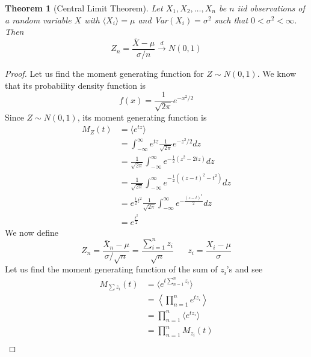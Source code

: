 \documentclass{article}
\newcommand{\twen}{\hspace{20pt}}
\newtheorem{theorem}[definition]{Theorem}
\begin{document}
\begin{theorem}[Central Limit Theorem]
    Let $X_1,X_2,\ldots, X_n$ be $n$ iid observations of a random variable $X$ with $\langle X_i\rangle =\mu$ and Var$(X_i) =\sigma^2$ such that $0<\sigma^2<\infty$. Then 
    \begin{equation*}
        Z_n = \frac{\bar X-\mu}{\sigma/n} \overset{d}{\longrightarrow} N(0,1)
    \end{equation*}
\end{theorem}
\begin{proof}
    Let us find the moment generating function for $Z\sim N(0,1)$. We know that its probability density function is 
    \begin{equation*}
        f(x) = \frac{1}{\sqrt{2\pi}}e^{-x^2/2}
    \end{equation*}
    Since $Z\sim N(0,1)$, its moment generating function is 
    \begin{equation*}
        \begin{split}
            M_Z(t) &= \langle e^{tz}\rangle \\
            &= \int^\infty_{-\infty}e^{tz}\frac{1}{\sqrt{2\pi}}e^{-z^2/2}dz \\
            &= \frac{1}{\sqrt{2\pi}} \int^\infty_{-\infty} e^{-\frac{1}{2}(z^2-2tz)}dz \\
            &=\frac{1}{\sqrt{2\pi}} \int^\infty_{-\infty} e^{-\frac{1}{2}((z-t)^2-t^2)} dz \\
            &=e^{\frac{1}{2}t^2} \frac{1}{\sqrt{2\pi}}\int^\infty_{-\infty} e^{-\frac{(z-t)^2}{2}}dz\\
            &= e^{\frac{t^2}{2}}
        \end{split}
    \end{equation*}
    We now define 
    \begin{equation*}
        Z_n =\frac{\bar X_n - \mu}{\sigma/\sqrt{n}} = \frac{\sum^n_{i=1}z_i}{\sqrt{n}} \twen z_i = \frac{X_i -\mu}{\sigma}
    \end{equation*}
    Let us find the moment generating function of the sum of $z_i$'s and see 
    \begin{equation*}
        \begin{split}
            M_{\sum z_i}(t) &= \langle e^{t\sum ^n_{n=1}z_i}\rangle \\ &= \left\langle \prod^n_{n=1} e^{tz_i} \right\rangle \\
            &= \prod^n_{n=1} \langle e^{tz_i} \rangle \\
            &= \prod^n_{n=1} M_{z_i}(t) \\

\end{split}
\end{equation*}
\end{proof}
\end{document}
